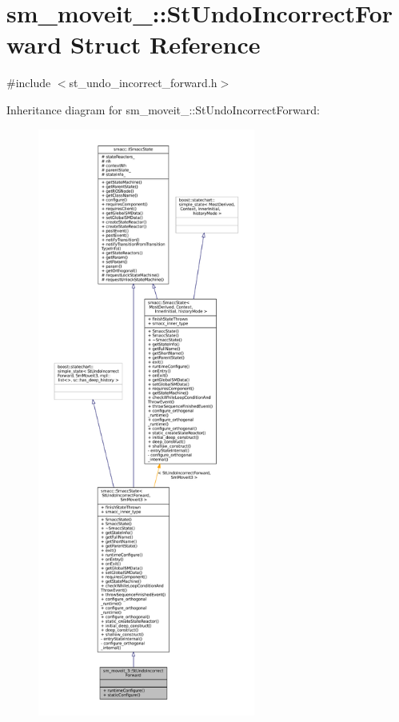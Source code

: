 \hypertarget{structsm__moveit__3_1_1StUndoIncorrectForward}{}\section{sm\+\_\+moveit\+\_\+:\+:St\+Undo\+Incorrect\+Forward Struct Reference}
\label{structsm__moveit__3_1_1StUndoIncorrectForward}


{\ttfamily \#include $<$st\+\_\+undo\+\_\+incorrect\+\_\+forward.\+h$>$}



Inheritance diagram for sm\+\_\+moveit\+\_\+:\+:St\+Undo\+Incorrect\+Forward\+:
\nopagebreak
\begin{figure}[H]
\begin{center}
\leavevmode
\includegraphics[height=550pt]{structsm__moveit__3_1_1StUndoIncorrectForward__inherit__graph}
\end{center}
\end{figure}


